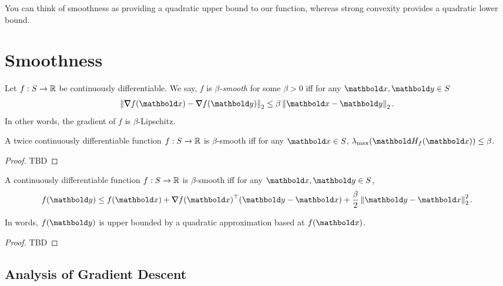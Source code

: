 You can think of smoothness as providing a quadratic upper bound to our function, whereas strong convexity provides a quadratic lower bound.

\section{Smoothness}

\begin{defn}[Smoothness] Let $f: S \to \mathbb{R}$ be continuously differentiable. We say, $f$ is \emph{$\beta$-smooth} for some $\beta > 0$ iff for any $\vx, \vy \in \sS$ \begin{align}
    \norm{\grad f(\vx) - \grad f(\vy)}_2 \leq \beta \norm{\vx - \vy}_2.
\end{align} In other words, the gradient of $f$ is $\beta$-Lipschitz.
\end{defn}
\begin{lem}
A twice continuously differentiable function $f: S \to \mathbb{R}$ is $\beta$-smooth iff for any $\vx \in \sS$, $\lambda_{\max}(\mH_f(\vx)) \leq \beta$.
\end{lem}
\begin{proof}
TBD
\end{proof}
\begin{lem}
A continuously differentiable function $f: S \to \mathbb{R}$ is $\beta$-smooth iff for any $\vx, \vy \in \sS$, \begin{align}
    f(\vy) \leq f(\vx) + \trans{\grad f(\vx)}(\vy - \vx) + \frac{\beta}{2}\norm{\vy - \vx}_2^2.
\end{align}
\end{lem} In words, $f(\vy)$ is upper bounded by a quadratic approximation based at $f(\vx)$.
\begin{proof}
TBD
\end{proof}

\subsection{Analysis of Gradient Descent}

